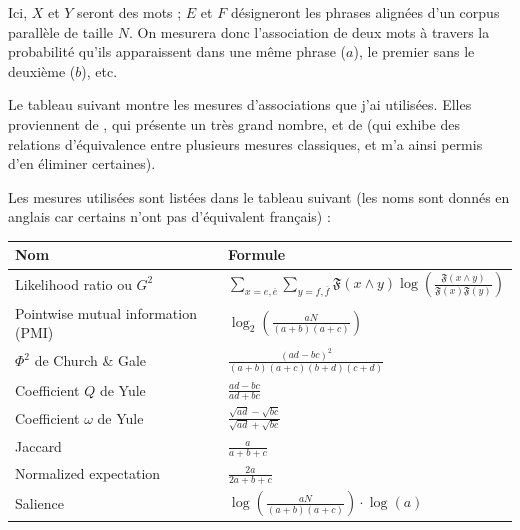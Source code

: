 \documentclass[a4paper,10pt]{article}
\begin{document}
Ici, $X$ et $Y$ seront des mots ; $E$ et $F$ désigneront les phrases alignées d'un corpus parallèle de taille $N$. On mesurera donc l'association de deux mots à travers la probabilité qu'ils apparaissent dans une même phrase ($a$), le premier sans le deuxième ($b$), etc.

Le tableau suivant montre les mesures d'associations que j'ai utilisées. Elles proviennent de \cite{pecina2006combining}, qui présente un très grand nombre, et de \cite{hoang2009re} (qui exhibe des relations d'équivalence entre plusieurs mesures classiques, et m'a ainsi permis d'en éliminer certaines). %

Les mesures utilisées sont listées dans le tableau suivant (les noms sont donnés en anglais car certains n'ont pas d'équivalent français) :

\begin{tabular}{|l|l|}
\hline
Nom & Formule \\
\hline
Likelihood ratio ou $G^2$

& $\sum_{x=e,\overline{e}}\sum_{y=f,\overline{f}}\mathfrak{F}(x\wedge y)\log\left(\frac{\mathfrak{F}(x\wedge y)}{\mathfrak{F}(x)\mathfrak{F}(y)}\right)$ \\

Pointwise %
 mutual information (PMI)  & $\log_2(\frac{aN}{(a+b)(a+c)})$ \\


$\Phi^2$ de Church \& Gale & $\frac{(ad-bc)^2}{(a+b)(a+c)(b+d)(c+d)}$ \\

Coefficient $Q$ de Yule & $\frac{ad-bc}{ad+bc}$ \\

Coefficient $\omega$ de Yule & $\frac{\sqrt{ad}-\sqrt{bc}}{\sqrt{ad}+\sqrt{bc}}$ \\


Jaccard & $\frac{a}{a+b+c}$ \\

Normalized expectation & $\frac{2a}{2a+b+c}$ \\

Salience & $\log\left(\frac{aN}{(a+b)(a+c)}\right)\cdot\log(a)$  \\


\end{tabular}
\end{document}
